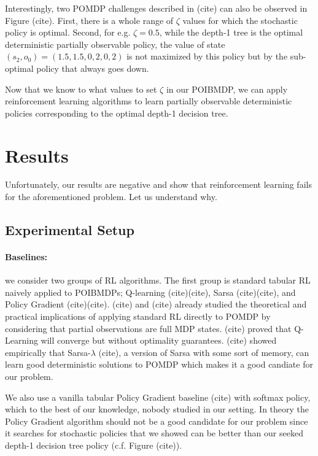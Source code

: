 Interestingly, two POMDP challenges described in (cite) can also be observed in Figure (cite). 
First, there is a whole range of $\zeta$ values for which the stochastic policy is optimal.
Second, for e.g. $\zeta=0.5$, while the depth-1 tree is the optimal deterministic partially observable policy, the value of state $(s_2, o_0) = (1.5, 1.5, 0, 2, 0, 2)$ is not maximized by this policy but by the sub-optimal policy that always goes down.

Now that we know to what values to set $\zeta$ in our POIBMDP, we can apply reinforcement learning algorithms to learn partially observable deterministic policies corresponding to the optimal depth-1 decision tree.

\section{Results}

Unfortunately, our results are negative and show that reinforcement learning fails for the aforementioned problem. Let us understand why.

\subsection{Experimental Setup}

\paragraph{Baselines:} we consider two groups of RL algorithms. The first group is standard tabular RL naively applied to POIBMDPs; Q-learning (cite)(cite), Sarsa (cite)(cite), and Policy Gradient (cite)(cite).
(cite) and (cite) already studied the theoretical and practical implications of applying standard RL directly to POMDP by considering that partial observations are full MDP states.
(cite) proved that Q-Learning will converge but without optimality guarantees. 
(cite) showed empirically that Sarsa-$\lambda$ (cite), a version of Sarsa with some sort of memory, can learn good deterministic solutions to POMDP which makes it a good candiate for our problem.

We also use a vanilla tabular Policy Gradient baseline (cite) with softmax policy, which to the best of our knowledge, nobody studied in our setting.
In theory the Policy Gradient algorithm should not be a good candidate for our problem since it searches for stochastic policies that we showed can be better than our seeked depth-1 decision tree policy (c.f. Figure (cite)).

